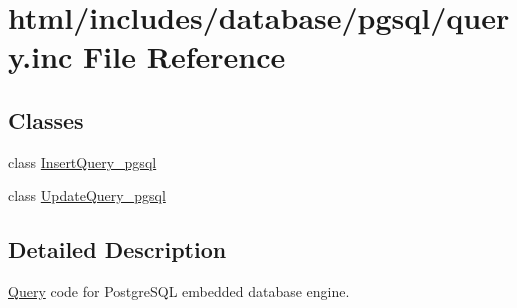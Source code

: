 \hypertarget{pgsql_2query_8inc}{
\section{html/includes/database/pgsql/query.inc File Reference}
\label{pgsql_2query_8inc}
}
\subsection*{Classes}
\begin{DoxyCompactItemize}
\item 
class \hyperlink{classInsertQuery__pgsql}{InsertQuery\_\-pgsql}
\item 
class \hyperlink{classUpdateQuery__pgsql}{UpdateQuery\_\-pgsql}
\end{DoxyCompactItemize}


\subsection{Detailed Description}
\hyperlink{classQuery}{Query} code for PostgreSQL embedded database engine. 
